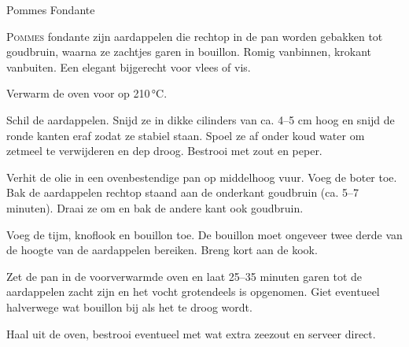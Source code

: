 \begin{recipe}{Pommes Fondante}
\label{recipe:pommes-fondante}


\lettrine{P}{ommes} fondante zijn aardappelen die rechtop in de pan worden gebakken tot goudbruin, waarna ze zachtjes garen in bouillon. Romig vanbinnen, krokant vanbuiten. Een elegant bijgerecht voor vlees of vis.

\begin{ingredients}
\end{ingredients}

\begin{steps}
  \item Verwarm de oven voor op 210\,°C.
  \item Schil de aardappelen. Snijd ze in dikke cilinders van ca. 4--5 cm hoog en snijd de ronde kanten eraf zodat ze stabiel staan. Spoel ze af onder koud water om zetmeel te verwijderen en dep droog. Bestrooi met zout en peper.
  \item Verhit de olie in een ovenbestendige pan op middelhoog vuur. Voeg de boter toe. Bak de aardappelen rechtop staand aan de onderkant goudbruin (ca. 5--7 minuten). Draai ze om en bak de andere kant ook goudbruin.
  \item Voeg de tijm, knoflook en bouillon toe. De bouillon moet ongeveer twee derde van de hoogte van de aardappelen bereiken. Breng kort aan de kook.
  \item Zet de pan in de voorverwarmde oven en laat 25--35 minuten garen tot de aardappelen zacht zijn en het vocht grotendeels is opgenomen. Giet eventueel halverwege wat bouillon bij als het te droog wordt.
  \item Haal uit de oven, bestrooi eventueel met wat extra zeezout en serveer direct.
\end{steps}
\end{recipe}
